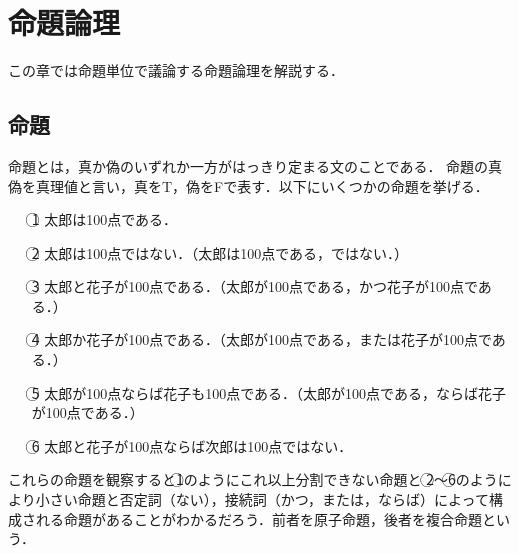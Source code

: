 \documentclass[10pt,b5paper,papersize,dvipdfmx]{jsbook}
\begin{document}
\section{命題論理}
この章では命題単位で議論する命題論理を解説する．
\subsection{命題}
命題とは，真か偽のいずれか一方がはっきり定まる文のことである．
命題の真偽を真理値と言い，真をT，偽をFで表す．以下にいくつかの命題を挙げる．
\begin{itemize}
\item[\textcircled{\scriptsize 1}]太郎は100点である．
\item[\textcircled{\scriptsize 2}]太郎は100点ではない．（太郎は100点である，ではない．）
\item[\textcircled{\scriptsize 3}]太郎と花子が100点である．（太郎が100点である，かつ花子が100点である．）
\item[\textcircled{\scriptsize 4}]太郎か花子が100点である．（太郎が100点である，または花子が100点である．）
\item[\textcircled{\scriptsize 5}]太郎が100点ならば花子も100点である．（太郎が100点である，ならば花子が100点である．）
\item[\textcircled{\scriptsize 6}]太郎と花子が100点ならば次郎は100点ではない．
\end{itemize}
これらの命題を観察すると\textcircled{\scriptsize 1}のようにこれ以上分割できない命題と
\textcircled{\scriptsize 2}～\textcircled{\scriptsize 6}のようにより小さい命題と否定詞（ない），接続詞（かつ，または，ならば）によって構成される命題があることがわかるだろう．前者を原子命題，後者を複合命題という．
\end{document}
